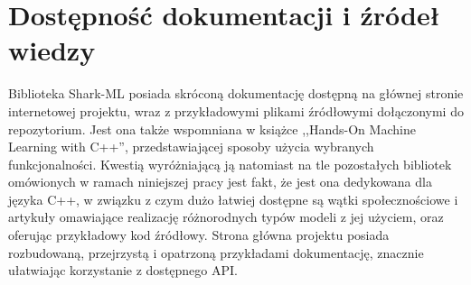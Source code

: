 
\section{Dostępność dokumentacji i źródeł wiedzy}

Biblioteka Shark-ML posiada skróconą dokumentację dostępną na głównej stronie internetowej projektu, wraz z przykładowymi plikami źródłowymi dołączonymi do repozytorium. Jest ona także wspomniana w książce ,,Hands-On Machine Learning with C++'', przedstawiającej sposoby użycia wybranych funkcjonalności. Kwestią wyróżniającą ją natomiast na tle pozostałych bibliotek omówionych w ramach niniejszej pracy jest fakt, że jest ona dedykowana dla języka C++, w związku z czym dużo łatwiej dostępne są wątki społecznościowe i artykuły omawiające realizację różnorodnych typów modeli z jej użyciem, oraz oferując przykładowy kod źródłowy. Strona główna projektu \cite{shark:home} posiada rozbudowaną, przejrzystą i opatrzoną przykładami dokumentację, znacznie ułatwiając korzystanie z dostępnego API.